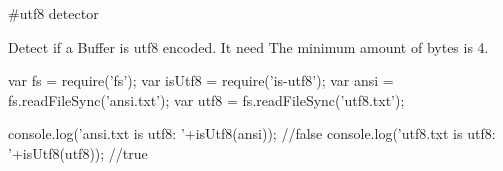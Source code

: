 \#utf8 detector

Detect if a Buffer is utf8 encoded. It need The minimum amount of bytes is 4.


\begin{DoxyCode}
var fs = require('fs');
var isUtf8 = require('is-utf8');
var ansi = fs.readFileSync('ansi.txt');
var utf8 = fs.readFileSync('utf8.txt');

console.log('ansi.txt is utf8: '+isUtf8(ansi)); //false
console.log('utf8.txt is utf8: '+isUtf8(utf8)); //true
\end{DoxyCode}
 